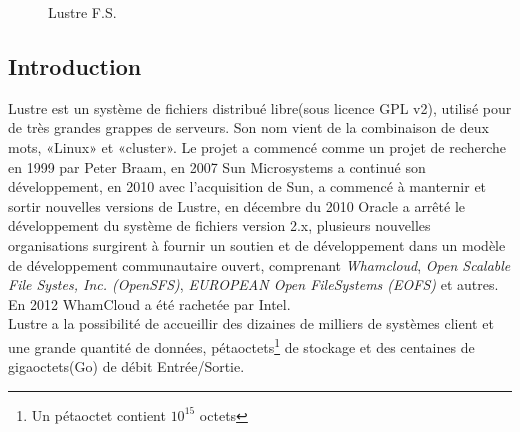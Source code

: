 \documentclass[12pt]{article}
\begin{document}
\begin{figure}[H] 
\caption{Lustre F.S.}
\label{fig:speciation}
\end{figure}

\subsection{Introduction}
Lustre est un système de fichiers distribué libre(sous licence GPL v2), utilisé pour de très grandes grappes de serveurs. Son nom vient de la combinaison de deux mots, «Linux» et «cluster». Le projet a commencé comme un projet de recherche en 1999 par Peter Braam, en 2007 Sun Microsystems a continué son développement, en 2010 avec l'acquisition de Sun, a commencé à manternir et sortir nouvelles versions de Lustre, en décembre du 2010 Oracle a arrêté le développement du système de fichiers version 2.x, plusieurs nouvelles organisations surgirent à fournir un soutien et de développement dans un modèle de développement communautaire ouvert, comprenant \textit{Whamcloud}, \textit{Open Scalable File Systes, Inc. (OpenSFS)}, \textit{EUROPEAN Open FileSystems (EOFS)} et autres. En 2012 WhamCloud a été rachetée par Intel.\\


Lustre a la possibilité de accueillir des dizaines de milliers de systèmes client et une grande quantité de données, pétaoctets\footnote{Un pétaoctet contient \begin{math}10^{15}\end{math} octets} de stockage et des centaines de gigaoctets(Go) de débit Entrée/Sortie. 
\end{document}
